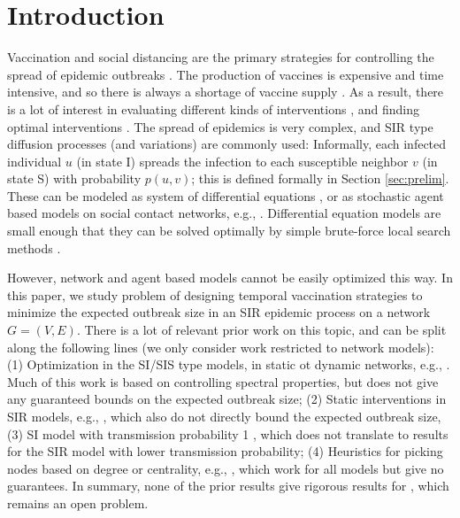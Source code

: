\section{Introduction}
\label{sec:intro}

Vaccination and social distancing are the primary strategies for controlling the spread of epidemic outbreaks
\cite{medlock:science09,Ogura2017,halloran:pnas08,lofgren:pnas14,zhang2015controlling,YaoSDM2014,AAAI1816714,PreciadoVM13_2,PreciadoVM13,PreciadoVM14,Aspnes:2005}.
The production of vaccines is expensive and time intensive, and so there is always a shortage of
vaccine supply \cite{cdc:temporal}. As a result, there is a lot of interest in evaluating different kinds of
interventions \cite{halloran:pnas08,lofgren:pnas14}, and finding optimal interventions \cite{medlock:science09}.
The spread of epidemics is very complex, and SIR type diffusion processes (and variations) are commonly used:
Informally, each infected individual $u$ (in state I) spreads the infection to each susceptible neighbor $v$ 
(in state S) with probability $p(u, v)$; this is defined formally in Section \ref{sec:prelim}.
These can be modeled as system of differential equations \cite{medlock:science09,AAAI1816714,venkataramanan:ichi17}, or as stochastic
agent based models on social contact networks, e.g., \cite{marathe:cacm13}.
Differential equation models are small enough that they can be solved optimally by simple brute-force
local search methods \cite{medlock:science09}.

However, network and agent based models cannot be easily optimized this way. 
In this paper, we study problem \prob{} of designing temporal vaccination strategies to minimize
the expected outbreak size in an SIR epidemic process on a network $G=(V, E)$.
There is a lot of relevant prior work on this topic, and can be split along the following lines
(we only consider work restricted to network models):
(1) Optimization in the SI/SIS type models, in static ot dynamic networks, e.g.,
\cite{PreciadoVM13_2,PreciadoVM13,PreciadoVM14,SahaSDM15,Ogura2017}. Much of this work is based on
controlling spectral properties, but does not give any guaranteed bounds on the expected outbreak size;
(2) Static interventions in SIR models, e.g., \cite{zhang2015controlling,YaoSDM2014}, which also do not
directly bound the expected outbreak size,
(3) SI model with transmission probability 1 \cite{Aspnes:2005}, which does not translate to results for
the SIR model with lower transmission probability;
(4) Heuristics for picking nodes based on degree or centrality, e.g., \cite{havlin},
which work for all models but give no guarantees.
In summary, none of the prior results give rigorous results for \prob{}, which remains an open problem.

